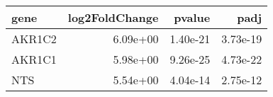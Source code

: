 \begin{tabular}{lrrr}
\toprule
  gene &  log2FoldChange &   pvalue &     padj \\
\midrule
AKR1C2 &        6.09e+00 & 1.40e-21 & 3.73e-19 \\
AKR1C1 &        5.98e+00 & 9.26e-25 & 4.73e-22 \\
   NTS &        5.54e+00 & 4.04e-14 & 2.75e-12 \\
\bottomrule
\end{tabular}
